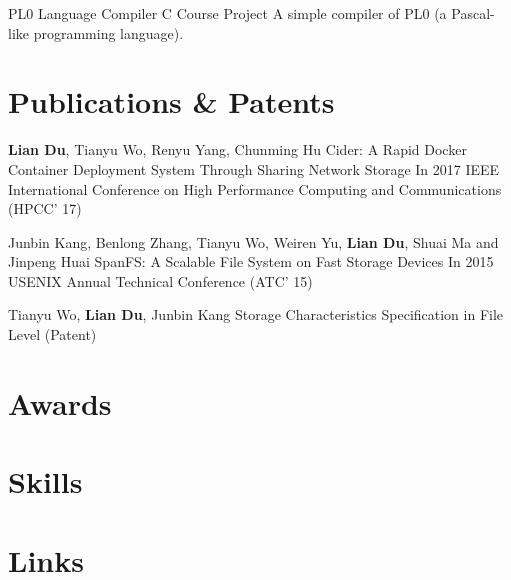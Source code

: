 \documentclass[11pt,a4paper]{moderncv}
\begin{document}
\vspace*{0.2\baselineskip}
{PL0 Language Compiler}
{C}
{Course Project}{}
{A simple compiler of PL0 (a Pascal-like programming language).
}

\section{Publications \& Patents}

{\textbf{Lian Du}\textnormal{, Tianyu Wo, Renyu Yang, Chunming Hu}}
{Cider: A Rapid Docker Container Deployment System Through Sharing Network Storage}
{In 2017 IEEE International Conference on High Performance Computing and Communications (HPCC' 17)}
{}{}{}

{\textnormal{Junbin Kang, Benlong Zhang, Tianyu Wo, Weiren Yu, }\textbf{Lian Du}\textnormal{, Shuai Ma and Jinpeng Huai}}
{SpanFS: A Scalable File System on Fast Storage Devices}
{In 2015 USENIX Annual Technical Conference (ATC' 15)}
{}{}{}

{\textnormal{Tianyu Wo, }\textbf{Lian Du}\textnormal{, Junbin Kang}}
{Storage Characteristics Specification in File Level}
{(Patent)}
{}{}{}


\section{Awards}


\section{Skills}


\section{Links}
\end{document}
